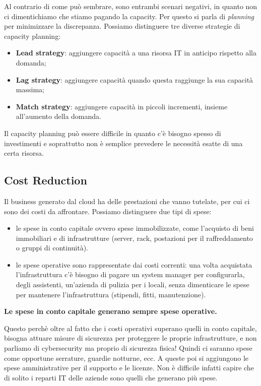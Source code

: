 Al contrario di come può sembrare, sono entrambi scenari negativi, in quanto non ci dimentichiamo che stiamo pagando la capacity. Per questo si parla di \textit{planning} per minimizzare la discrepanza.
Possiamo distinguere tre diverse strategie di capacity planning:
\begin{itemize}
    \item \textbf{Lead strategy}: aggiungere capacità a una risorsa IT in anticipo rispetto alla domanda;
    \item \textbf{Lag strategy}: aggiungere capacità quando questa raggiunge la sua capacità massima;
    \item \textbf{Match strategy}: aggiungere capacità in piccoli incrementi, insieme all'aumento della domanda.
\end{itemize}
Il capacity planning può essere difficile in quanto c'è bisogno spesso di investimenti e soprattutto non è semplice prevedere le necessità esatte di una certa risorsa.

\subsection{Cost Reduction}
Il business generato dal cloud ha delle prestazioni che vanno tutelate, per cui ci sono dei costi da affrontare. Possiamo distinguere due tipi di spese:
\begin{itemize}
    \item le spese in conto capitale ovvero spese immobilizzate, come l'acquisto di beni immobiliari e di infrastrutture (server, rack, postazioni per il raffreddamento o gruppi di continuità). 
    \item le spese operative sono rappresentate dai costi correnti: una volta acquistata l'infrastruttura c'è bisogno di pagare un system manager per configurarla, degli assistenti, un'azienda di pulizia per i locali, senza dimenticare le spese per mantenere l'infrastruttura (stipendi, fitti, manutenzione).
\end{itemize}
\begin{mdframed}[backgroundcolor=gray!40,shadow=false]
\textbf{Le spese in conto capitale generano sempre spese operative.} 

Questo perchè oltre al fatto che i costi operativi superano quelli in conto capitale, bisogna attuare misure di sicurezza per proteggere le proprie infrastrutture, e non parliamo di cybersecurity ma proprio di sicurezza fisica! Quindi ci saranno spese come opportune serrature, guardie notturne, ecc. A queste poi si aggiungono le spese amministrative per il supporto e le licenze. Non è difficile infatti capire che di solito i reparti IT delle aziende sono quelli che generano più spese.
\end{mdframed}
\break

